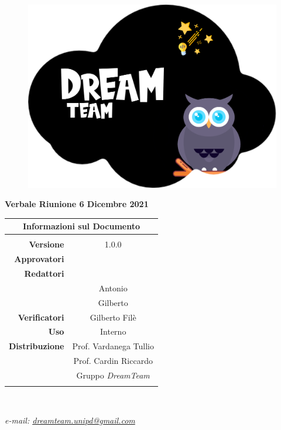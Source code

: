 \begin{center}

\begin{figure}
\centering
\includegraphics[scale=0.05]{Sezioni/images/DreamTeam.png} 
\end{figure}

{\Huge{\textbf{Verbale Riunione 6 Dicembre 2021}}} \\ [1cm]

\begin{table}[htbp]
\centering
\begin{tabular}{r|c}
\multicolumn{2}{c}{\textbf{Informazioni sul Documento}} \\
\hline \\
\textbf{Versione} & 1.0.0 \\ \rule{0pt}{3ex}    
\textbf{Approvatori} &  \\ \rule{0pt}{3ex}      
\textbf{Redattori} & \PV{} \\ \rule{0pt}{2ex}   
& Antonio \\ \rule{0pt}{2ex}    
& Gilberto \\ \rule{0pt}{3ex}    
\textbf{Verificatori} & Gilberto Filè \\ \rule{0pt}{3ex}       
\textbf{Uso} & Interno \\ \rule{0pt}{3ex}    
\textbf{Distribuzione} & Prof. Vardanega Tullio \\ \rule{0pt}{2ex}   
& Prof. Cardin Riccardo \\ \rule{0pt}{2ex}   
& Gruppo \textit{DreamTeam} \\ \rule{0pt}{0.1cm}   
\end{tabular} \\ [0.5cm]
\end{table}

\textsl{ e-mail: \href{mailto:dreamteam.unipd@gmail.com}{dreamteam.unipd@gmail.com} } \\[2cm]
\end{center}
\pagebreak